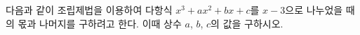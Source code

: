 다음과 같이 조립제법을 이용하여 다항식 $x^3+ax^2+bx+c$를 $x-3$으로 나누었을 때의 몫과 나머지를 구하려고 한다. 이때 상수 $a$, $b$, $c$의 값을 구하시오.\par{}\par\smallskip\noindent
